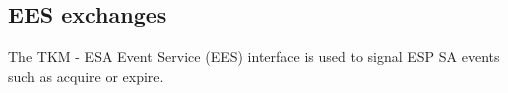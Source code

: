 \subsection{EES exchanges}
The TKM - ESA Event Service (EES) interface is used to signal ESP SA events such as acquire or expire.